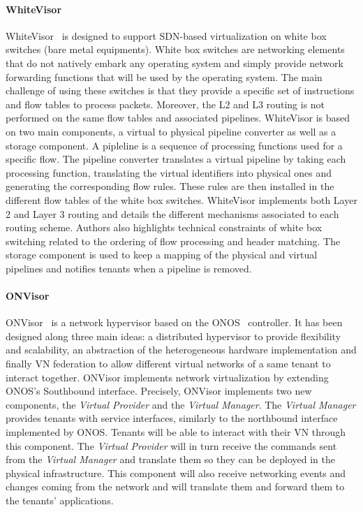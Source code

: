 \paragraph{WhiteVisor}
WhiteVisor~\cite{whitevisor-Yu2019} is designed to support SDN-based virtualization on white box switches (\ie bare metal equipments).
White box switches are networking elements that do not natively embark any operating system and simply provide network forwarding functions that will be used by the operating system.  
The main challenge of using these switches is that they provide a specific set of instructions and flow tables to process packets. 
Moreover, the L2 and L3 routing is not performed on the same flow tables and associated pipelines.
WhiteVisor is based on two main components, a virtual to physical pipeline converter as well as a storage component.
A pipleline is a sequence of processing functions used for a specific flow.
The pipeline converter translates a virtual pipeline by taking each processing function, translating the virtual identifiers into physical ones and generating the corresponding flow rules. These rules are then installed in the different flow tables of the white box switches. WhiteVisor implements both Layer 2 and Layer 3 routing and details the different mechanisms associated to each routing scheme. Authors also highlights technical constraints of white box switching related to the ordering of flow processing and header matching. The storage component is used to keep a mapping of the physical and virtual pipelines and notifies tenants when a pipeline is removed. 


\paragraph{ONVisor}
ONVisor~\cite{ONVisor-Han2018} is a network hypervisor based on the ONOS~\cite{onos-Berde2014a} controller.
It has been designed along three main ideas: a distributed hypervisor to provide flexibility and scalability, an abstraction of the heterogeneous hardware implementation and finally VN federation to allow different virtual networks of a same tenant to interact together.
ONVisor implements network virtualization by extending ONOS's Southbound interface.
Precisely, ONVisor implements two new components, the \textit{Virtual Provider} and the \textit{Virtual Manager}.
The \textit{Virtual Manager} provides tenants with service interfaces, similarly to the northbound interface implemented by ONOS. Tenants will be able to interact with their VN through this component.
The \textit{Virtual Provider} will in turn receive the commands sent from the \textit{Virtual Manager} and translate them so they can be deployed in the physical infrastructure. This component will also receive networking events and changes coming from the network and will translate them and forward them to the tenants' applications.

